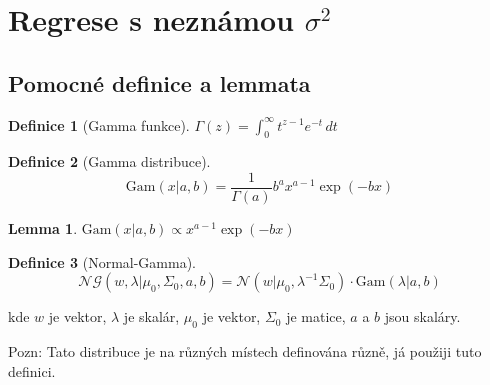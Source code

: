 \documentclass{article}
\newcommand{\NN}{\mathcal{N}}
\newcommand{\NoG}{\mathcal{NG}}
\newcommand{\Gam}{\mathrm{Gam}}
\newtheorem{lemma}{Lemma}
\theoremstyle{definition}
\newtheorem{definice}{Definice}
\begin{document}
\section{Regrese s neznámou $\sigma^2$}
\subsection{Pomocné definice a lemmata}
\begin{definice}[Gamma funkce]
	$\Gamma(z) = \int_0^\infty  t^{z-1} e^{-t}\,dt$
\end{definice}
\begin{definice}[Gamma distribuce]
	$$\Gam(x|a,b) = \frac{1}{\Gamma(a)} b^a x^{a-1}\exp(-bx)$$
\end{definice}
\begin{lemma}
$\Gam(x|a,b)\propto x^{a-1}\exp (-bx)$
\end{lemma}
\begin{definice}[Normal-Gamma]
$$\NoG(w,\lambda|\mu_0,\Sigma_0,a,b)=\NN(w|\mu_0,\lambda^{-1}\Sigma_0)\cdot\Gam(\lambda|a,b)$$

kde $w$ je vektor, $\lambda$ je skalár, $\mu_0$ je vektor, $\Sigma_0$ je matice, $a$ a $b$ jsou skaláry.

Pozn: Tato distribuce je na různých místech definována různě, já použiji tuto definici.
\end{definice}
\end{document}
